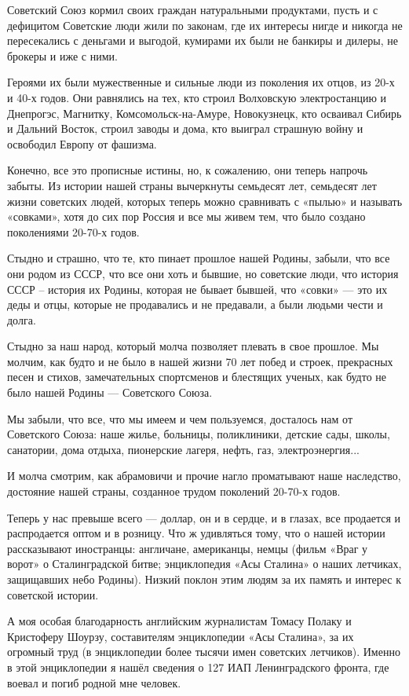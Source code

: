Советский Союз кормил своих граждан натуральными продуктами, пусть и с
дефицитом Советские люди жили по законам, где их интересы нигде и никогда не
пересекались с деньгами и выгодой, кумирами их были не банкиры и дилеры, не
брокеры и иже с ними.

Героями их были мужественные и сильные люди из поколения их отцов, из 20-х и
40-х годов.  Они равнялись на тех, кто строил Волховскую электростанцию и
Днепрогэс, Магнитку, Комсомольск-на-Амуре, Новокузнецк, кто осваивал Сибирь и
Дальний Восток, строил заводы и дома, кто выиграл страшную войну и освободил
Европу от фашизма.

Конечно, все это прописные истины, но, к сожалению, они теперь напрочь забыты.
Из истории нашей страны вычеркнуты семьдесят лет, семьдесят лет жизни советских
людей, которых теперь можно сравнивать с «пылью» и называть «совками», хотя до
сих пор Россия и все мы живем тем, что было создано поколениями 20-70-х годов.

Стыдно и страшно, что те, кто пинает прошлое нашей Родины, забыли, что все они
родом из СССР, что все они хоть и бывшие, но советские люди, что история СССР –
история их Родины, которая не бывает бывшей, что «совки» --- это их деды и отцы,
которые не продавались и не предавали, а были людьми чести и долга.

Стыдно за наш народ, который молча позволяет плевать в свое прошлое. Мы молчим,
как будто и не было в нашей жизни 70 лет побед и строек, прекрасных песен и
стихов, замечательных спортсменов и блестящих ученых, как будто не было нашей
Родины --- Советского Союза.

Мы забыли, что все, что мы имеем и чем пользуемся, досталось нам от Советского
Союза: наше жилье, больницы, поликлиники, детские сады, школы, санатории, дома
отдыха, пионерские лагеря, нефть, газ, электроэнергия...

И молча смотрим, как абрамовичи и прочие нагло проматывают наше наследство,
достояние нашей страны, созданное трудом поколений 20-70-х годов.

Теперь у нас превыше всего --- доллар, он и в сердце, и в глазах, все продается и
распродается оптом и в розницу. Что ж удивляться тому, что о нашей истории
рассказывают иностранцы: англичане, американцы, немцы (фильм «Враг у ворот» о
Сталинградской битве; энциклопедия «Асы Сталина» о наших летчиках, защищавших
небо Родины). Низкий поклон этим людям за их память и интерес к советской
истории.

А моя особая благодарность английским журналистам Томасу Полаку и Кристоферу
Шоурзу, составителям энциклопедии «Асы Сталина», за их огромный труд (в
энциклопедии более тысячи имен советских летчиков). Именно в этой энциклопедии
я нашёл сведения о 127 ИАП Ленинградского фронта, где воевал и погиб родной мне
человек.

